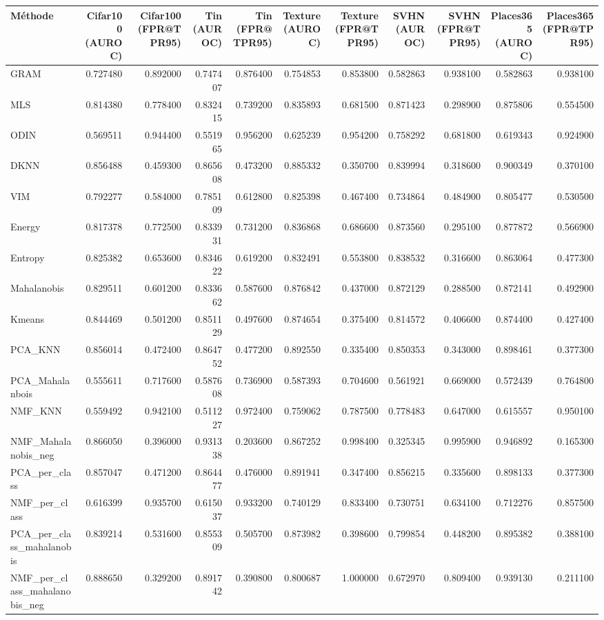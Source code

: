 \begin{tabular}{lrrrrrrrrrr}
\toprule
Méthode & Cifar100 (AUROC) & Cifar100 (FPR@TPR95) & Tin (AUROC) & Tin (FPR@TPR95) & Texture (AUROC) & Texture (FPR@TPR95) & SVHN (AUROC) & SVHN (FPR@TPR95) & Places365 (AUROC) & Places365 (FPR@TPR95) \\
\midrule
GRAM & 0.727480 & 0.892000 & 0.747407 & 0.876400 & 0.754853 & 0.853800 & 0.582863 & 0.938100 & 0.582863 & 0.938100 \\
MLS & 0.814380 & 0.778400 & 0.832415 & 0.739200 & 0.835893 & 0.681500 & 0.871423 & 0.298900 & 0.875806 & 0.554500 \\
ODIN & 0.569511 & 0.944400 & 0.551965 & 0.956200 & 0.625239 & 0.954200 & 0.758292 & 0.681800 & 0.619343 & 0.924900 \\
DKNN & 0.856488 & 0.459300 & 0.865608 & 0.473200 & 0.885332 & 0.350700 & 0.839994 & 0.318600 & 0.900349 & 0.370100 \\
VIM & 0.792277 & 0.584000 & 0.785109 & 0.612800 & 0.825398 & 0.467400 & 0.734864 & 0.484900 & 0.805477 & 0.530500 \\
Energy & 0.817378 & 0.772500 & 0.833931 & 0.731200 & 0.836868 & 0.686600 & 0.873560 & 0.295100 & 0.877872 & 0.566900 \\
Entropy & 0.825382 & 0.653600 & 0.834622 & 0.619200 & 0.832491 & 0.553800 & 0.838532 & 0.316600 & 0.863064 & 0.477300 \\
Mahalanobis & 0.829511 & 0.601200 & 0.833662 & 0.587600 & 0.876842 & 0.437000 & 0.872129 & 0.288500 & 0.872141 & 0.492900 \\
Kmeans & 0.844469 & 0.501200 & 0.851129 & 0.497600 & 0.874654 & 0.375400 & 0.814572 & 0.406600 & 0.874400 & 0.427400 \\
PCA_KNN & 0.856014 & 0.472400 & 0.864752 & 0.477200 & 0.892550 & 0.335400 & 0.850353 & 0.343000 & 0.898461 & 0.377300 \\
PCA_Mahalanbois & 0.555611 & 0.717600 & 0.587608 & 0.736900 & 0.587393 & 0.704600 & 0.561921 & 0.669000 & 0.572439 & 0.764800 \\
NMF_KNN & 0.559492 & 0.942100 & 0.511227 & 0.972400 & 0.759062 & 0.787500 & 0.778483 & 0.647000 & 0.615557 & 0.950100 \\
NMF_Mahalanobis_neg & 0.866050 & 0.396000 & 0.931338 & 0.203600 & 0.867252 & 0.998400 & 0.325345 & 0.995900 & 0.946892 & 0.165300 \\
PCA_per_class & 0.857047 & 0.471200 & 0.864477 & 0.476000 & 0.891941 & 0.347400 & 0.856215 & 0.335600 & 0.898133 & 0.377300 \\
NMF_per_class & 0.616399 & 0.935700 & 0.615037 & 0.933200 & 0.740129 & 0.833400 & 0.730751 & 0.634100 & 0.712276 & 0.857500 \\
PCA_per_class_mahalanobis & 0.839214 & 0.531600 & 0.855309 & 0.505700 & 0.873982 & 0.398600 & 0.799854 & 0.448200 & 0.895382 & 0.388100 \\
NMF_per_class_mahalanobis_neg & 0.888650 & 0.329200 & 0.891742 & 0.390800 & 0.800687 & 1.000000 & 0.672970 & 0.809400 & 0.939130 & 0.211100 \\
\bottomrule
\end{tabular}
